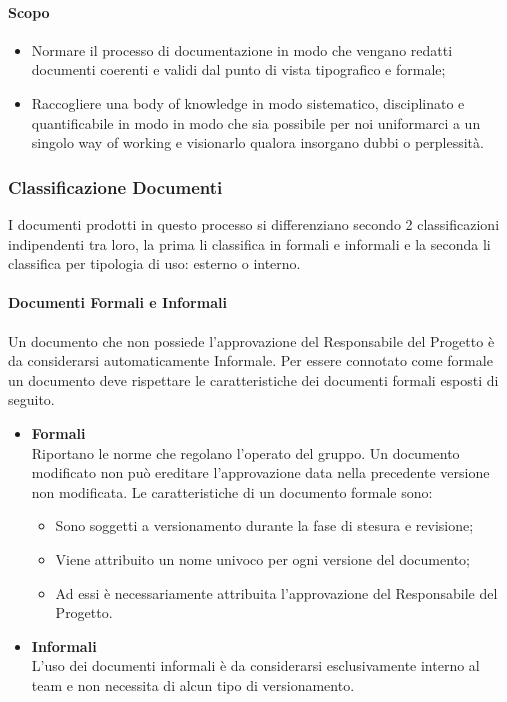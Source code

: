 			\paragraph{Scopo}
				\begin{itemize}
					\item Normare il processo di documentazione in modo che vengano redatti documenti coerenti e validi dal punto di vista tipografico e formale;
					\item Raccogliere una body of knowledge in modo sistematico, disciplinato e quantificabile in modo in modo che sia possibile per noi uniformarci a un singolo way of working e visionarlo qualora insorgano dubbi o perplessità.
				\end{itemize}
		\subsubsection{Classificazione Documenti}
			I documenti prodotti in questo processo si differenziano secondo 2 classificazioni indipendenti tra loro, la prima li classifica in formali e informali e la seconda li classifica per tipologia di uso: esterno o interno.
			\paragraph{Documenti Formali e Informali}
				Un documento che non possiede l’approvazione del Responsabile del Progetto è da considerarsi automaticamente Informale. Per essere connotato come formale un documento deve rispettare le caratteristiche dei documenti formali esposti di seguito.
				\begin{itemize}
					\item\textbf{Formali}\\
						Riportano le norme che regolano l’operato del gruppo. Un documento modificato non può ereditare l’approvazione data nella precedente versione non modificata.
						Le caratteristiche di un documento formale sono:
						\begin{itemize}
							\item  Sono soggetti a versionamento durante la fase di stesura e revisione;
							\item Viene attribuito un nome univoco per ogni versione del documento;
							\item  Ad essi è necessariamente attribuita l’approvazione del Responsabile del Progetto.
						\end{itemize}

					\item\textbf{Informali}\\
						L’uso dei documenti informali è da considerarsi esclusivamente interno al team e non necessita di alcun tipo di versionamento.
				\end{itemize}
